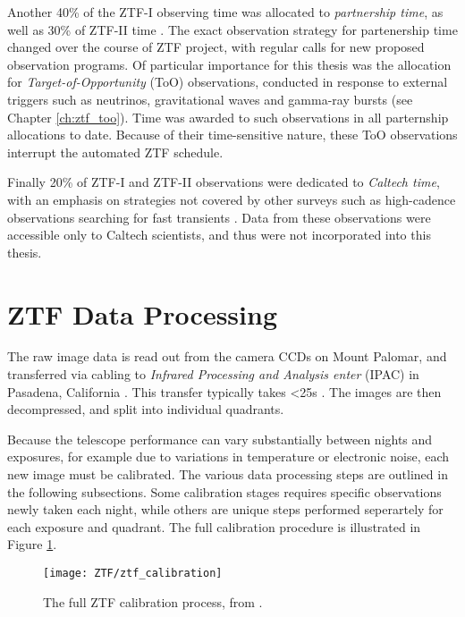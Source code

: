Another 40\% of the ZTF-I observing time was allocated to \emph{partnership time}, as well as 30\% of ZTF-II time \cite{ztf_survey_19, ztfii_graham_20}. The exact observation strategy for partenership time changed over the course of ZTF project, with regular calls for new proposed observation programs. Of particular importance for this thesis was the allocation for \emph{Target-of-Opportunity} (ToO) observations, conducted in response to external triggers such as neutrinos, gravitational waves and gamma-ray bursts (see Chapter \ref{ch:ztf_too}). Time was awarded to such observations in all parternship allocations to date. Because of their time-sensitive nature, these ToO observations interrupt the automated ZTF schedule.

Finally 20\% of ZTF-I and ZTF-II observations were dedicated to \emph{Caltech time}, with an emphasis on strategies not covered by other surveys such as high-cadence observations searching for fast transients \cite{ztf_survey_19, ztfii_graham_20}. Data from these observations were accessible only to Caltech scientists, and thus were not incorporated into this thesis.

\section{ZTF Data Processing}

The raw image data is read out from the camera CCDs on Mount Palomar, and transferred via cabling to \emph{Infrared Processing and Analysis enter} (IPAC) in Pasadena, California . This transfer typically takes <25s \cite{ztf_system}. The images are then decompressed, and split into individual quadrants. 

Because the telescope performance can vary substantially between nights and exposures, for example due to variations in temperature or electronic noise, each new image must be calibrated. The various data processing steps are outlined in the following subsections. Some calibration stages requires specific observations newly taken each night, while others are unique steps performed seperartely for each exposure and quadrant. The full calibration procedure is illustrated in Figure \ref{fig:ztf_calibration}.

\begin{figure}[!ht]
	\centering \texttt{[image: ZTF/ztf\_calibration]}
	\caption{The full ZTF calibration process, from \cite{ztf_data_processing}.}
	\label{fig:ztf_calibration}
\end{figure}

